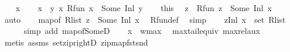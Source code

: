 \begin{isabellebody}
\ \ \isamarkupfalse%
\ x\isanewline
\ \ \isamarkupfalse%
\ {\isachardoublequoteopen}x\ {\isasymin}\ {\isacharbraceleft}{\kern0pt}y{\isachardot}{\kern0pt}\ {\isasymexists}x{\isachardot}{\kern0pt}\ R{\isacharunderscore}{\kern0pt}fun\ x\ {\isacharequal}{\kern0pt}\ Some\ {\isacharparenleft}{\kern0pt}Inl\ y{\isacharparenright}{\kern0pt}{\isacharbraceright}{\kern0pt}{\isachardoublequoteclose}\isanewline
\ \ \isamarkupfalse%
\ this\ \isamarkupfalse%
\ z\ \ {\isachardoublequoteopen}R{\isacharunderscore}{\kern0pt}fun\ z\ {\isacharequal}{\kern0pt}\ Some\ {\isacharparenleft}{\kern0pt}Inl\ x{\isacharparenright}{\kern0pt}{\isachardoublequoteclose}\ \isamarkupfalse%
\ auto\isanewline
\ \ \isamarkupfalse%
\ {\isachardoublequoteopen}map{\isacharunderscore}{\kern0pt}of\ R{\isacharunderscore}{\kern0pt}list\ z\ {\isacharequal}{\kern0pt}\ Some\ {\isacharparenleft}{\kern0pt}Inl\ x{\isacharparenright}{\kern0pt}{\isachardoublequoteclose}\ \isamarkupfalse%
\ R{\isacharunderscore}{\kern0pt}fun{\isacharunderscore}{\kern0pt}def\ \isamarkupfalse%
\ simp\isanewline
\ \ \isamarkupfalse%
\ {\isachardoublequoteopen}{\isacharparenleft}{\kern0pt}z{\isacharcomma}{\kern0pt}Inl\ x{\isacharparenright}{\kern0pt}\ {\isasymin}\ set\ {\isacharparenleft}{\kern0pt}R{\isacharunderscore}{\kern0pt}list{\isacharparenright}{\kern0pt}{\isachardoublequoteclose}\isanewline
\ \ \ \ \isamarkupfalse%
\ {\isacharparenleft}{\kern0pt}simp\ add{\isacharcolon}{\kern0pt}\ map{\isacharunderscore}{\kern0pt}of{\isacharunderscore}{\kern0pt}SomeD{\isacharparenright}{\kern0pt}\isanewline
\ \ \isamarkupfalse%
\ {\isachardoublequoteopen}x\ {\isasymle}\ w{\isacharunderscore}{\kern0pt}max{\isachardoublequoteclose}\ \isamarkupfalse%
\ max{\isacharunderscore}{\kern0pt}tail{\isacharunderscore}{\kern0pt}equiv\ max{\isacharunderscore}{\kern0pt}rel{\isacharunderscore}{\kern0pt}aux\isanewline
\ \ \ \ \isamarkupfalse%
\ {\isacharparenleft}{\kern0pt}metis\ assms{\isacharparenleft}{\kern0pt}{}{\isacharparenright}{\kern0pt}\ set{\isacharunderscore}{\kern0pt}zip{\isacharunderscore}{\kern0pt}rightD\ zip{\isacharunderscore}{\kern0pt}map{\isacharunderscore}{\kern0pt}fst{\isacharunderscore}{\kern0pt}snd{\isacharparenright}{\kern0pt}\isanewline
{}\isamarkupfalse%
%
\endisatagproof
{\isafoldproof}%
%
\isadelimproof
\isanewline
%
\endisadelimproof

\end{isabellebody}

